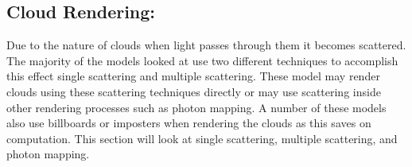 \subsection{Cloud Rendering:}
Due to the nature of clouds when light passes through them it becomes scattered.
The majority of the models looked at use two different techniques to accomplish this effect single scattering and multiple scattering.
These model may render clouds using these scattering techniques directly or may use scattering inside other rendering processes such as photon mapping.
A number of these models also use billboards or imposters when rendering the clouds as this saves on computation.
This section will look at single scattering, multiple scattering, and photon mapping. 



